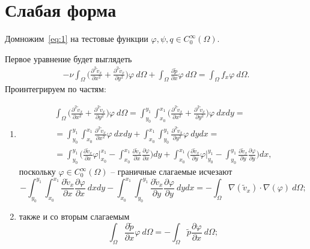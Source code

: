 \documentclass[a4paper,14pt]{extarticle}
\begin{document}
	
	
	
	
	
	
	
	
	
	

	\newpage
	\section{Слабая форма}
	Домножим~\ref{eq:1} на тестовые функции $\varphi, \psi, q \in C_0^\infty(\Omega)$.
	
	Первое уравнение будет выглядеть
	\begin{equation}
		\begin{gathered}
		-\nu \int_{\Omega} \big(\frac{\partial^2 \tilde v_x}{\partial x^2} +\frac{\partial^2 \tilde v_x}{\partial y^2}\big) \varphi ~ d \Omega + 
		\int_{\Omega} \frac{\partial \tilde p}{\partial x} \varphi ~ d \Omega = 
		\int_{\Omega} f_x \varphi ~ d \Omega.
		\end{gathered}
	\end{equation}
	Проинтегрируем по частям:
	\begin{enumerate}
		\item
		\begin{equation*}
			\begin{gathered}
			 \int_{\Omega} \big(\frac{\partial^2 \tilde v_x}{\partial x^2} +\frac{\partial^2 \tilde v_x}{\partial y^2}\big) \varphi ~ d \Omega = 
			 \int_{y_0}^{y_1} \int_{x_0}^{x_1} \big(\frac{\partial^2 \tilde v_x}{\partial x^2} +\frac{\partial^2 \tilde v_x}{\partial y^2}\big)  \varphi ~ d x dy = \\
			=
			\int_{y_0}^{y_1}\int_{x_0}^{x_1} \frac{\partial^2 \tilde v_x}{\partial x^2}  \varphi~dx dy
			 + 
			\int_{x_0}^{x_1}\int_{y_0}^{y_1} \frac{\partial^2 \tilde v_x}{\partial y^2}  \varphi~ dy dx = \\
			= \int_{y_0}^{y_1} \Big( \frac{\partial \tilde v_x}{\partial x} \varphi \Big|_{x_0}^{x_1} - \int_{x_0}^{x_1} \frac{\partial \tilde v_x}{\partial x}	\frac{\partial \varphi}{\partial x}	
			 \Big) dy
			 +
			 \int_{x_0}^{x_1} \Big( \frac{\partial \tilde v_x}{\partial y} \varphi \Big|_{y_0}^{y_1} - \int_{y_0}^{y_1} \frac{\partial \tilde v_x}{\partial y}	\frac{\partial \varphi}{\partial y}\Big) dx,
		\end{gathered}
		\end{equation*}
		поскольку \(\varphi\in C_0^\infty(\Omega)\) -- граничные слагаемые исчезают
		\begin{equation*}
			- \int_{y_0}^{y_1} \int_{x_0}^{x_1} \frac{\partial \tilde v_x}{\partial x}	\frac{\partial \varphi}{\partial x} ~ dx dy
			- \int_{x_0}^{x_1} \int_{y_0}^{y_1} \frac{\partial \tilde v_x}{\partial y}	\frac{\partial \varphi}{\partial y}~  dy dx =
			- \int_{\Omega} \nabla(\tilde v_x) \cdot \nabla(\varphi) ~ d \Omega;
		\end{equation*}
		
		\item также и со вторым слагаемым
		\begin{equation*}
			\int_{\Omega} \frac{\partial \tilde p}{\partial x} \varphi ~ d \Omega = - \int_{\Omega}\tilde p \frac{\partial \varphi}{\partial x} ~ d \Omega;
		\end{equation*}
	\end{enumerate}
\end{document}

